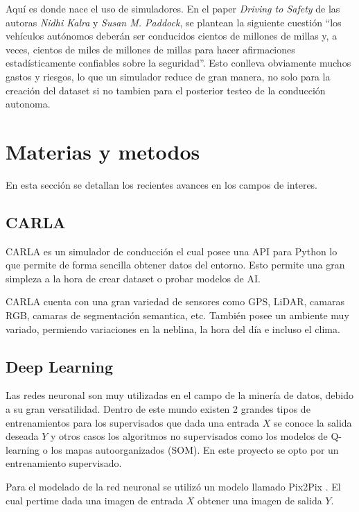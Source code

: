 \documentclass[]{IEEEtran}
\begin{document}
    Aquí es donde nace el uso de simuladores. En el paper \textit{Driving to Safety} de las autoras \textit{Nidhi Kalra} y \textit{Susan M. Paddock}, se 
    plantean la siguiente cuestión ``los vehículos autónomos deberán ser conducidos cientos de millones de millas y, a veces, cientos de miles de millones de millas
    para hacer afirmaciones estadísticamente confiables sobre la seguridad''. Esto conlleva obviamente muchos gastos y riesgos, lo que un simulador reduce de gran 
    manera, no solo para la creación del dataset si no tambien para el posterior testeo de la conducción autonoma. 



    \section{Materias y metodos}

    En esta sección se detallan los recientes avances en los campos de interes.


    \subsection{CARLA}

    CARLA \cite{CARLA-Simulator} es un simulador de conducción el cual posee una API para Python lo que 
    permite de forma sencilla obtener datos del entorno. Esto permite una gran simpleza 
    a la hora de crear dataset o probar modelos de AI.
    
    CARLA cuenta con una gran variedad de sensores como GPS, LiDAR, camaras RGB, camaras de segmentación semantica, etc.
    También posee un ambiente muy variado, permiendo variaciones en la neblina, la hora del día e incluso el clima.

    \subsection{Deep Learning}

    Las redes neuronal son muy utilizadas en el campo de la minería de datos, debido a 
    su gran versatilidad. Dentro de este mundo existen 2 grandes tipos de entrenamientos 
    para los supervisados que dada una entrada $X$ se conoce la salida deseada $Y$ y 
    otros casos los algoritmos no supervisados como los modelos de Q-learning o los mapas autoorganizados (SOM).
    En este proyecto se opto por un entrenamiento supervisado.

    

    Para el modelado de la red neuronal se utilizó un modelo llamado Pix2Pix \cite{Pix2Pix}.
    El cual pertime dada una imagen de entrada $X$ obtener una imagen de salida $Y$.
\end{document}
